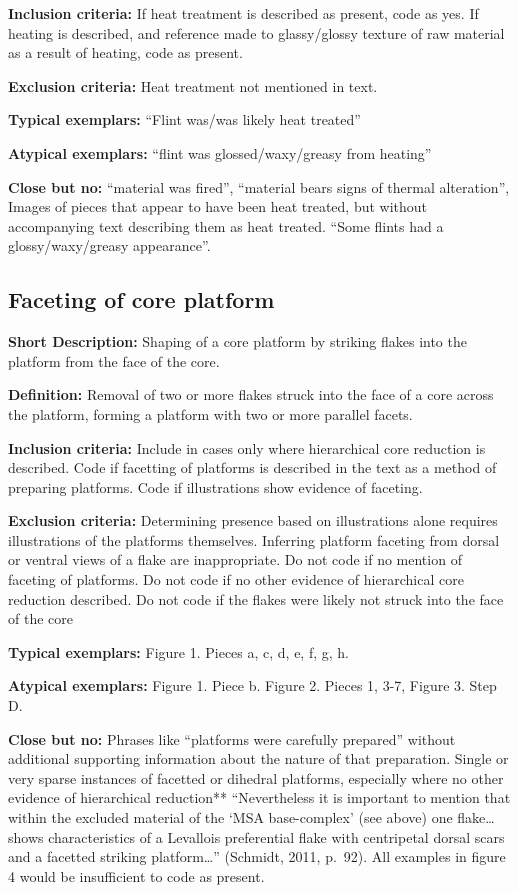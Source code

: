 \documentclass[
]{article}
\begin{document}
\textbf{Inclusion criteria:} If heat treatment is described as present,
code as yes. If heating is described, and reference made to
glassy/glossy texture of raw material as a result of heating, code as
present.

\textbf{Exclusion criteria:} Heat treatment not mentioned in text.

\textbf{Typical exemplars:} ``Flint was/was likely heat treated''

\textbf{Atypical exemplars:} ``flint was glossed/waxy/greasy from
heating''

\textbf{Close but no:} ``material was fired'', ``material bears signs of
thermal alteration'', Images of pieces that appear to have been heat
treated, but without accompanying text describing them as heat treated.
``Some flints had a glossy/waxy/greasy appearance''.

\hypertarget{faceting-of-core-platform}{%
\subsection{Faceting of core platform}\label{faceting-of-core-platform}}

\textbf{Short Description:} Shaping of a core platform by striking
flakes into the platform from the face of the core.

\textbf{Definition:} Removal of two or more flakes struck into the face
of a core across the platform, forming a platform with two or more
parallel facets.

\textbf{Inclusion criteria:} Include in cases only where hierarchical
core reduction is described. Code if facetting of platforms is described
in the text as a method of preparing platforms. Code if illustrations
show evidence of faceting.

\textbf{Exclusion criteria:} Determining presence based on illustrations
alone requires illustrations of the platforms themselves. Inferring
platform faceting from dorsal or ventral views of a flake are
inappropriate. Do not code if no mention of faceting of platforms. Do
not code if no other evidence of hierarchical core reduction described.
Do not code if the flakes were likely not struck into the face of the
core

\textbf{Typical exemplars:} Figure 1. Pieces a, c, d, e, f, g, h.

\textbf{Atypical exemplars:} Figure 1. Piece b. Figure 2. Pieces 1, 3-7,
Figure 3. Step D.

\textbf{Close but no:} Phrases like ``platforms were carefully
prepared'' without additional supporting information about the nature of
that preparation. Single or very sparse instances of facetted or
dihedral platforms, especially where no other evidence of hierarchical
reduction** ``Nevertheless it is important to mention that within the
excluded material of the `MSA base-complex' (see above) one
flake\ldots{} shows characteristics of a Levallois preferential flake
with centripetal dorsal scars and a facetted striking platform\ldots{}''
(Schmidt, 2011, p.~92). All examples in figure 4 would be insufficient
to code as present.
\end{document}
